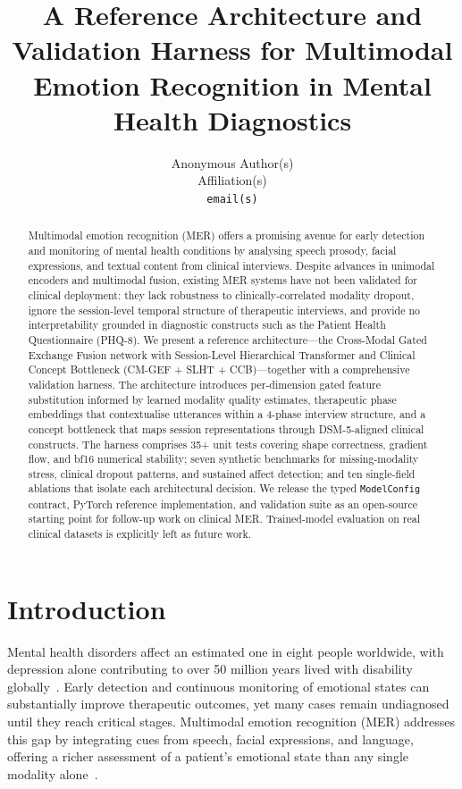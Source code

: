 \documentclass{article}
\title{A Reference Architecture and Validation Harness for Multimodal Emotion Recognition in Mental Health Diagnostics}
\author{%
  Anonymous Author(s) \\
  Affiliation(s) \\
  \texttt{email(s)} \\
}
\begin{document}
\maketitle

\begin{abstract}
Multimodal emotion recognition (MER) offers a promising avenue for early detection and
monitoring of mental health conditions by analysing speech prosody, facial expressions,
and textual content from clinical interviews. Despite advances in unimodal encoders and
multimodal fusion, existing MER systems have not been validated for clinical deployment:
they lack robustness to clinically-correlated modality dropout, ignore the session-level
temporal structure of therapeutic interviews, and provide no interpretability grounded in
diagnostic constructs such as the Patient Health Questionnaire (PHQ-8). We present a
reference architecture---the Cross-Modal Gated Exchange Fusion network with Session-Level
Hierarchical Transformer and Clinical Concept Bottleneck (CM-GEF + SLHT + CCB)---together
with a comprehensive validation harness. The architecture introduces per-dimension gated
feature substitution informed by learned modality quality estimates, therapeutic phase
embeddings that contextualise utterances within a 4-phase interview structure, and a
concept bottleneck that maps session representations through DSM-5-aligned clinical
constructs. The harness comprises 35+ unit tests covering shape correctness, gradient flow,
and bf16 numerical stability; seven synthetic benchmarks for missing-modality stress,
clinical dropout patterns, and sustained affect detection; and ten single-field ablations
that isolate each architectural decision. We release the typed \texttt{ModelConfig}
contract, PyTorch reference implementation, and validation suite as an open-source
starting point for follow-up work on clinical MER. Trained-model evaluation on real
clinical datasets is explicitly left as future work.
\end{abstract}


\section{Introduction}

Mental health disorders affect an estimated one in eight people worldwide, with depression
alone contributing to over 50 million years lived with disability globally~\cite{who2023depression}.
Early detection and continuous monitoring of emotional states can substantially improve
therapeutic outcomes, yet many cases remain undiagnosed until they reach critical
stages. Multimodal emotion recognition (MER) addresses this gap by integrating cues from
speech, facial expressions, and language, offering a richer assessment of a patient's
emotional state than any single modality alone~\cite{survey2026multimodal}.
\end{document}
